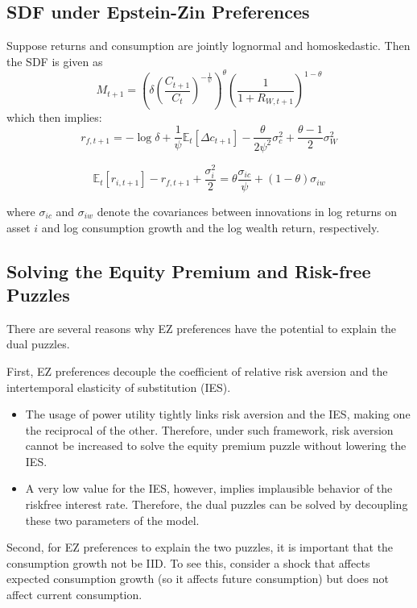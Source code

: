 \documentclass[
]{book}
\providecommand{\tightlist}{%
  \setlength{\itemsep}{0pt}\setlength{\parskip}{0pt}}
\begin{document}
\hypertarget{sdf-under-epstein-zin-preferences}{%
\subsection{SDF under Epstein-Zin Preferences}\label{sdf-under-epstein-zin-preferences}}

Suppose returns and consumption are jointly lognormal and homoskedastic. Then the SDF is given as
\[
M_{t+1}=\left(\delta\left(\frac{C_{t+1}}{C_{t}}\right)^{-\frac{1}{\psi}}\right)^{\theta}\left(\frac{1}{1+R_{W,t+1}}\right)^{1-\theta}
\]
which then implies:
\[
r_{f,t+1} = -\log\delta+\frac{1}{\psi}\mathbb{E}_{t}\left[\Delta c_{t+1}\right]-\frac{\theta}{2\psi^{2}}\sigma_{c}^{2}+\frac{\theta-1}{2}\sigma_{W}^{2}
\]

\[
\mathbb{E}_t[r_{i,t+1}]-r_{f,t+1} +\frac{\sigma_{i}^{2}}{2}=\theta\frac{\sigma_{ic}}{\psi}+\left(1-\theta\right)\sigma_{iw} 
\]

where \(\sigma_{ic}\) and \(\sigma_{iw}\) denote the covariances between innovations in log returns on asset \(i\) and log consumption growth and the log wealth return, respectively.

\hypertarget{solving-the-equity-premium-and-risk-free-puzzles}{%
\subsection{Solving the Equity Premium and Risk-free Puzzles}\label{solving-the-equity-premium-and-risk-free-puzzles}}

There are several reasons why EZ preferences have the potential to explain the dual puzzles.

First, EZ preferences decouple the coefficient of relative risk aversion and the intertemporal elasticity of substitution (IES).

\begin{itemize}
\tightlist
\item
  The usage of power utility tightly links risk aversion and the IES, making one the reciprocal of the other. Therefore, under such framework, risk aversion cannot be increased to solve the equity premium puzzle without lowering the IES.
\item
  A very low value for the IES, however, implies implausible behavior of the riskfree interest rate. Therefore, the dual puzzles can be solved by decoupling these two parameters of the model.
\end{itemize}

Second, for EZ preferences to explain the two puzzles, it is important that the consumption growth not be IID. To see this, consider a shock that affects expected consumption growth (so it affects future consumption) but does not affect current consumption.
\end{document}
